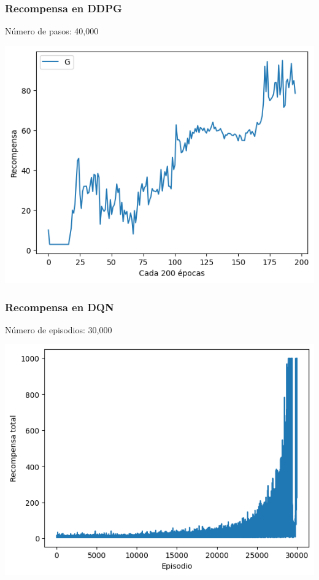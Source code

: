 \documentclass[
    11pt,
    aspectratio=169,
]{beamer}
\begin{document}
\begin{frame}
\frametitle{Recompensa en DDPG}

Número de pasos: 40,000

\begin{center}
\includegraphics[scale=0.5]{Images/reward_ddpg}
\end{center}

\end{frame}

\begin{frame}
\frametitle{Recompensa en DQN}

Número de episodios: 30,000

\begin{center}
\includegraphics[scale=0.5]{Images/reward_dqn}
\end{center}

\end{frame}
\end{document}
